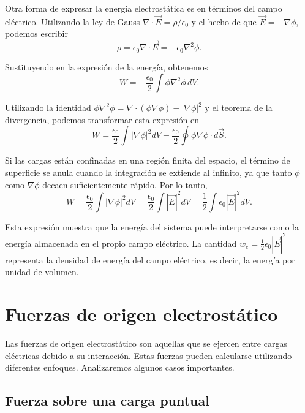 \documentclass[12pt,a4paper]{book}
\begin{document}
Otra forma de expresar la energía electrostática es en términos del campo eléctrico. Utilizando la ley de Gauss $\nabla \cdot \vec{E} = \rho/\epsilon_0$ y el hecho de que $\vec{E} = -\nabla\phi$, podemos escribir
\begin{equation}
\rho = \epsilon_0 \nabla \cdot \vec{E} = -\epsilon_0 \nabla^2\phi.
\end{equation}

Sustituyendo en la expresión de la energía, obtenemos
\begin{equation}
W = -\frac{\epsilon_0}{2} \int \phi \nabla^2\phi\, dV.
\end{equation}

Utilizando la identidad $\phi \nabla^2\phi = \nabla \cdot (\phi \nabla\phi) - |\nabla\phi|^2$ y el teorema de la divergencia, podemos transformar esta expresión en
\begin{equation}
W = \frac{\epsilon_0}{2} \int |\nabla\phi|^2 dV - \frac{\epsilon_0}{2} \oint \phi \nabla\phi \cdot d\vec{S}.
\end{equation}

Si las cargas están confinadas en una región finita del espacio, el término de superficie se anula cuando la integración se extiende al infinito, ya que tanto $\phi$ como $\nabla\phi$ decaen suficientemente rápido. Por lo tanto,
\begin{equation}
W = \frac{\epsilon_0}{2} \int |\nabla\phi|^2 dV = \frac{\epsilon_0}{2} \int |\vec{E}|^2 dV = \frac{1}{2} \int \epsilon_0 |\vec{E}|^2 dV.
\end{equation}

Esta expresión muestra que la energía del sistema puede interpretarse como la energía almacenada en el propio campo eléctrico. La cantidad $w_e = \frac{1}{2}\epsilon_0 |\vec{E}|^2$ representa la densidad de energía del campo eléctrico, es decir, la energía por unidad de volumen.

\section{Fuerzas de origen electrostático}

Las fuerzas de origen electrostático son aquellas que se ejercen entre cargas eléctricas debido a su interacción. Estas fuerzas pueden calcularse utilizando diferentes enfoques. Analizaremos algunos casos importantes.

\subsection{Fuerza sobre una carga puntual}
\end{document}
